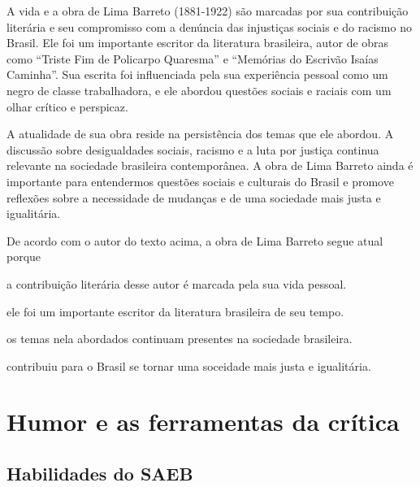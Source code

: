 \begin{myquote}

A vida e a obra de Lima Barreto (1881-1922) são marcadas por sua contribuição
literária e seu compromisso com a denúncia das injustiças sociais e do racismo
no Brasil. Ele foi um importante escritor da literatura brasileira, autor de
obras como ``Triste Fim de Policarpo Quaresma'' e ``Memórias do Escrivão
Isaías Caminha''. Sua escrita foi influenciada pela sua experiência pessoal
como um negro de classe trabalhadora, e ele abordou questões sociais e raciais
com um olhar crítico e perspicaz.

A atualidade de sua obra reside na persistência dos temas que ele abordou. 
A discussão sobre desigualdades sociais, racismo e a luta por justiça
continua relevante na sociedade brasileira contemporânea. A obra de Lima
Barreto ainda é importante para entendermos questões
sociais e culturais do Brasil e promove reflexões sobre a necessidade de
mudanças e de uma sociedade mais justa e igualitária. 


\end{myquote}

De acordo com o autor do texto acima, a obra de Lima Barreto segue atual 
porque 

\begin{escolha}

  \item a contribuição literária desse autor é marcada pela sua vida pessoal.

  \item ele foi um importante escritor da literatura brasileira de seu tempo.
  
  \item os temas nela abordados continuam presentes na sociedade brasileira.
  
  \item contribuiu para o Brasil se tornar uma soceidade mais justa e igualitária.

\end{escolha}


\chapter{Humor e as ferramentas da crítica}

\section*{Habilidades do SAEB}

